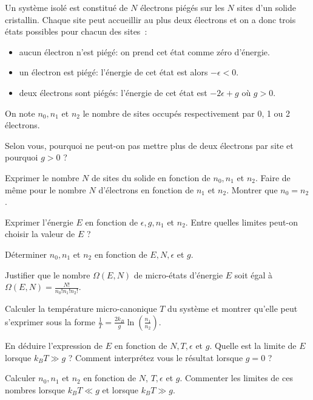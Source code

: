 Un système isolé est constitué de $N$ électrons piégés sur les $N$ sites d'un solide cristallin. Chaque site peut accueillir au plus deux électrons et on a donc trois états possibles pour chacun des sites~:

\begin{itemize}
\item aucun électron n'est piégé: on prend cet état comme zéro d'énergie.
\item un électron est piégé: l'énergie de cet état est alors $-\epsilon<0$.
\item deux électrons sont piégés: l'énergie de cet état est $-2\epsilon+g$ où $g>0$. 
\end{itemize}

On note $n_0, n_1$ et $n_2$ le nombre de sites occupés respectivement par 0, 1 ou 2 électrons.

\question
Selon vous, pourquoi ne peut-on pas mettre plus de deux électrons par site et pourquoi $g>0$ ?

\question
Exprimer le nombre $N$ de sites du solide en fonction de $n_0, n_1$ et $n_2$. Faire de même pour le nombre $N$ d'électrons en fonction de $n_1$ et $n_2$. Montrer que $n_0=n_2$.

\question
Exprimer l'énergie $E$ en fonction de $\epsilon, g, n_1$ et $n_2$. Entre quelles limites peut-on choisir la valeur de $E$ ?

\question
Déterminer $n_0, n_1$ et $n_2$ en fonction de $E, N, \epsilon$ et $g$.

\question
Justifier que le nombre $\Omega(E,N)$ de micro-états d'énergie $E$ soit égal à  $\Omega(E,N)=\frac{N!}{n_0!n_1!n_2!}$.


\question
Calculer la température micro-canonique $T$ du système et montrer qu'elle peut s'exprimer sous la forme $\frac{1}{T}=\frac{2k_B}{g}\ln(\frac{n_1}{n_2})$.

\question
En déduire l'expression de $E$ en fonction de $N, T, \epsilon$ et $g$. Quelle est la limite de $E$ lorsque $k_B T \gg g$ ? Comment interprétez vous le résultat lorsque $g=0$ ?

\question
Calculer $n_0, n_1$ et $n_2$ en fonction de $N$,  $T, \epsilon$ et $g$. Commenter les limites de ces nombres lorsque $k_B T \ll g$ et lorsque $k_B T \gg g$.
